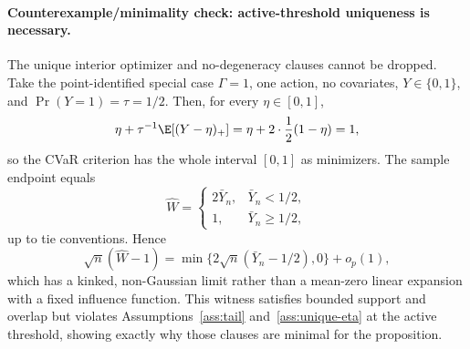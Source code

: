 \paragraph{Counterexample/minimality check: active-threshold uniqueness is necessary.}
The unique interior optimizer and no-degeneracy clauses cannot be dropped.  Take the point-identified special case \(\Gamma=1\), one action, no covariates, \(Y\in\{0,1\}\), and \(\Pr(Y=1)=\tau=1/2\).  Then, for every \(\eta\in[0,1]\),
\[
\eta+\tau^{-1}\E[(Y-\eta)_+]
=
\eta+2\cdot \frac12(1-\eta)=1,
\]
so the CVaR criterion has the whole interval \([0,1]\) as minimizers.  The sample endpoint equals
\[
\widehat W=
\begin{cases}
2\bar Y_n, & \bar Y_n<1/2,\\
1, & \bar Y_n\ge 1/2,
\end{cases}
\]
up to tie conventions.  Hence
\[
\sqrt n(\widehat W-1)
=
\min\{2\sqrt n(\bar Y_n-1/2),0\}+o_p(1),
\]
which has a kinked, non-Gaussian limit rather than a mean-zero linear expansion with a fixed influence function.  This witness satisfies bounded support and overlap but violates Assumptions~\ref{ass:tail} and~\ref{ass:unique-eta} at the active threshold, showing exactly why those clauses are minimal for the proposition.
